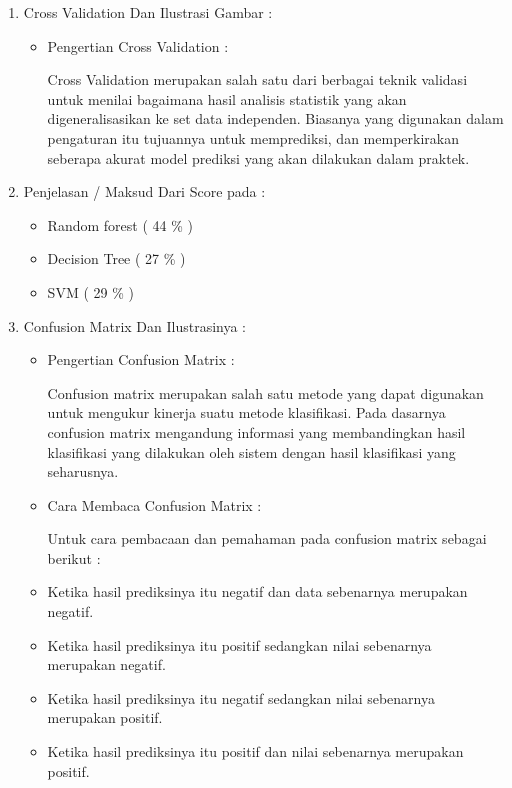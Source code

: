 \begin{enumerate}
\begin{itemize}
\begin{enumerate}
\begin{itemize}
\par
\end{itemize}
\item Cross Validation Dan Ilustrasi Gambar :
\begin{itemize}
\item Pengertian Cross Validation :
\par Cross Validation merupakan salah satu dari berbagai teknik validasi untuk menilai bagaimana hasil analisis statistik yang akan digeneralisasikan ke set data independen. Biasanya yang digunakan dalam pengaturan itu tujuannya  untuk memprediksi, dan  memperkirakan seberapa akurat model prediksi yang akan dilakukan dalam praktek. 
\par 
\end{itemize}
\par
\item Penjelasan / Maksud Dari Score pada :
\begin{itemize}
\item Random forest ( 44 \% )
\par 
\par
\item Decision Tree ( 27 \% )
\par 
\par
\item SVM ( 29 \% )
\par 

\par
\end{itemize}
\item Confusion Matrix Dan Ilustrasinya :
\begin{itemize}
\item Pengertian Confusion Matrix :
\par Confusion matrix merupakan salah satu metode yang dapat digunakan untuk mengukur kinerja suatu metode klasifikasi. Pada dasarnya confusion matrix mengandung informasi yang membandingkan hasil klasifikasi yang dilakukan oleh sistem dengan hasil klasifikasi yang seharusnya.
\item Cara Membaca Confusion Matrix :
\par Untuk cara pembacaan dan pemahaman pada confusion matrix sebagai berikut :
\item Ketika hasil prediksinya itu negatif dan data sebenarnya merupakan negatif.
\item Ketika hasil prediksinya itu positif sedangkan nilai sebenarnya merupakan negatif.
\item Ketika hasil prediksinya itu negatif sedangkan nilai sebenarnya merupakan positif.
\item Ketika hasil prediksinya itu positif dan nilai sebenarnya merupakan positif.
\end{itemize}
\par


\end{enumerate}
\end{itemize}
\end{enumerate}

